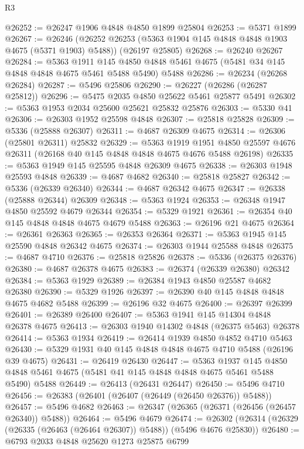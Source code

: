 \begin{lexlean}{R3}
\begin{coremodule}
@26252 := @26247 @1906 @4848 @4850 @1899 @25804
@26253 := @5371 @1899
@26267 := @26246
    (@26252 @26253 (@5363 @1904 @145 @4848 @4848 @1903 @4675 (@5371 @1903) @5488))
    (@26197 @25805)
@26268 := @26240 @26267
@26284 := @5363
    @1911
    @145
    @4850
    @4848
    @5461
    @4675
    (@5481 @34 @145 @4848 @4848 @4675 @5461 @5488 @5490)
    @5488
@26286 := @26234 (@26268 @26284)
@26287 := @5496 @25806
@26290 := @26227 (@26286 (@26287 @25812))
@26296 := @5475 @2035 @4850 @25622 @5461 @25877 @5491
@26302 := @5363 @1953 @2034 @25600 @25621 @25832 @25876
@26303 := @5330 @41
@26306 := @26303 @1952 @25598 @4848
@26307 := @25818 @25828
@26309 := @5336 (@25888 @26307)
@26311 := @4687 @26309 @4675
@26314 := @26306 (@25801 @26311) @25832
@26329 := @5363
    @1919
    @1951
    @4850
    @25597
    @4676
    @26311
    (@26168 @40 @145 @4848 @4848 @4675 @4676 @5488 @26198)
@26335 := @5363 @1949 @145 @25595 @4848 @26309 @4675
@26338 := @26303 @1948 @25593 @4848
@26339 := @4687 @4682
@26340 := @25818 @25827
@26342 := @5336 (@26339 @26340)
@26344 := @4687 @26342 @4675
@26347 := @26338 (@25888 @26344) @26309
@26348 := @5363 @1924
@26353 := @26348 @1947 @4850 @25592 @4679 @26344
@26354 := @5329 @1921
@26361 := @26354 @40 @145 @4848 @4848 @4675 @4679 @5488
@26363 := @26196 @21 @4675
@26364 := @26361 @26363
@26365 := @26353 @26364
@26371 := @5363 @1945 @145 @25590 @4848 @26342 @4675
@26374 := @26303 @1944 @25588 @4848
@26375 := @4687 @4710
@26376 := @25818 @25826
@26378 := @5336 (@26375 @26376)
@26380 := @4687 @26378 @4675
@26383 := @26374 (@26339 @26380) @26342
@26384 := @5363 @1929
@26389 := @26384 @1943 @4850 @25587 @4682 @26380
@26390 := @5329 @1926
@26397 := @26390 @40 @145 @4848 @4848 @4675 @4682 @5488
@26399 := @26196 @32 @4675
@26400 := @26397 @26399
@26401 := @26389 @26400
@26407 := @5363 @1941 @145 @14304 @4848 @26378 @4675
@26413 := @26303 @1940 @14302 @4848 (@26375 @5463) @26378
@26414 := @5363 @1934
@26419 := @26414 @1939 @4850 @4852 @4710 @5463
@26430 := @5329 @1931 @40 @145 @4848 @4848 @4675 @4710 @5488 (@26196 @39 @4675)
@26431 := @26419 @26430
@26447 := @5363
    @1937
    @145
    @4850
    @4848
    @5461
    @4675
    (@5481 @41 @145 @4848 @4848 @4675 @5461 @5488 @5490)
    @5488
@26449 := @26413 (@26431 @26447)
@26450 := @5496 @4710
@26456 := @26383 (@26401 (@26407 (@26449 (@26450 @26376)) @5488))
@26457 := @5496 @4682
@26463 := @26347 (@26365 (@26371 (@26456 (@26457 @26340)) @5488))
@26464 := @5496 @4679
@26474 := @26302 (@26314 (@26329 (@26335 (@26463 (@26464 @26307)) @5488)) (@5496 @4676 @25830))
@26480 := @6793 @2033 @4848 @25620 @1273 @25875 @6799

\end{coremodule}
\end{lexlean}
